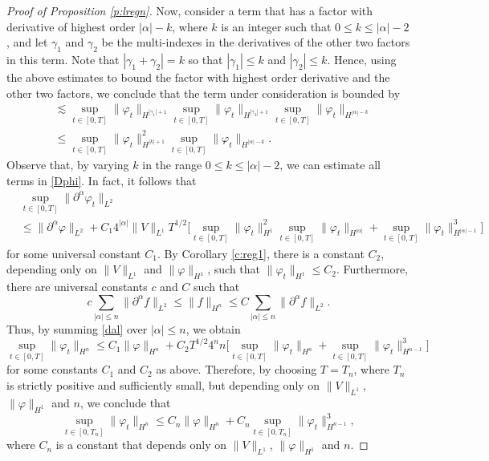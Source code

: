 \documentclass[11pt,a4paper]{scrartcl}
\begin{document}
\begin{proof}[Proof of Proposition \ref{p:lregn}]
  Now, consider a term that has a factor with derivative of highest order
  $|\alpha| - k$, where $k$ is an integer such that $0 \le k \le |\alpha| -
  2$, and let $\gamma_1$ and $\gamma_2$ be the multi-indexes in the
  derivatives of the other two factors in this term. Note that $|\gamma_1 +
  \gamma_2|=k$ so that $|\gamma_1| \le k$ and $|\gamma_2| \le k$. Hence, using
  the above estimates to bound the factor with highest order derivative and
  the other two factors, we conclude that the term under consideration is
  bounded by
  \begin{align*}
    & \apprle \sup_{t \in [0,T]} \| \varphi_t \|_{H^{|\gamma_1|+1}} \sup_{t
    \in [0,T]} \| \varphi_t \|_{H^{|\gamma_2|+1}} \sup_{t \in [0,T]} \|
    \varphi_t \|_{H^{|\alpha|-k}} \\
    & \le \sup_{t \in [0,T]} \| \varphi_t \|_{H^{|k|+1}}^2 \sup_{t \in [0,T]}
    \| \varphi_t \|_{H^{|\alpha|-k}}.
  \end{align*}
  Observe that, by varying $k$ in the range $0 \le k \le |\alpha|-2$, we can
  estimate all terms in \eqref{Dphi}. In fact, it follows that
  \begin{equation} \label{dal}
    \begin{split}
      & \sup_{t \in [0,T]} \| \partial^\alpha \varphi_t \|_{L^2} \\
      & \le \| \partial^\alpha \varphi \|_{L^2} + C_1 4^{|\alpha|} \| V
      \|_{L^1} T^{1/2} \Big[ \sup_{t \in [0,T]} \| \varphi_t \|_{H^1}^2
      \sup_{t \in [0,T]} \| \varphi_t \|_{H^{|\alpha|}} + \sup_{t \in [0,T]}
      \| \varphi_t \|_{H^{|\alpha|-1}}^3 \Big]
    \end{split}
  \end{equation}
  for some universal constant $C_1$. By Corollary \ref{c:reg1}, there is a
  constant $C_2$, depending only on $\| V \|_{L^1}$ and $\| \varphi \|_{H^1}$,
  such that $\| \varphi_t \|_{H^1} \le C_2$. Furthermore, there are universal
  constants $c$ and $C$ such that
  \[
    c \sum_{|\alpha| \le n} \| \partial^\alpha f \|_{L^2} \le \| f \|_{H^n}
    \le C \sum_{|\alpha| \le n} \| \partial^\alpha f \|_{L^2}.
  \]
  Thus, by summing \eqref{dal} over $|\alpha| \le n$, we obtain
  \[
    \sup_{t \in [0,T]} \| \varphi_t \|_{H^n} \le C_1 \| \varphi \|_{H^n} + C_2
    T^{1/2} 4^n n \Big[ \sup_{t \in [0,T]} \| \varphi_t \|_{H^n} + \sup_{t \in
    [0,T]} \| \varphi_t \|_{H^{n-1}}^3 \Big]
  \]
  for some constants $C_1$ and $C_2$ as above. Therefore, by choosing $T =
  T_n$, where $T_n$ is strictly positive and sufficiently small, but depending
  only on $\| V \|_{L^1}$, $\| \varphi \|_{H^1}$ and $n$, we conclude that
  \[
    \sup_{t \in [0,T_n]} \| \varphi_t \|_{H^n} \le C_n \| \varphi \|_{H^n} +
    C_n \sup_{t \in [0,T_n]} \| \varphi_t \|_{H^{n-1}}^3,
  \]
  where $C_n$ is a constant that depends only on $\| V \|_{L^1}$, $\| \varphi
  \|_{H^1}$ and $n$.
\end{proof}
\end{document}
